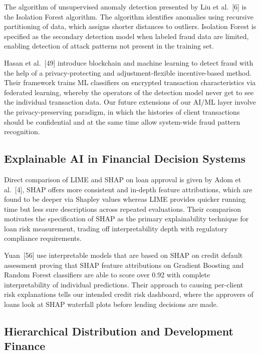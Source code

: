 \documentclass[12pt,a4paper]{report}
\begin{document}
The algorithm of unsupervised anomaly detection presented by Liu et al.~[6] is the Isolation Forest algorithm. The algorithm identifies anomalies using recursive partitioning of data, which assigns shorter distances to outliers. Isolation Forest is specified as the secondary detection model when labeled fraud data are limited, enabling detection of attack patterns not present in the training set.

Hasan et al.~[49] introduce blockchain and machine learning to detect fraud with the help of a privacy-protecting and adjustment-flexible incentive-based method. Their framework trains ML classifiers on encrypted transaction characteristics via federated learning, whereby the operators of the detection model never get to see the individual transaction data. Our future extensions of our AI/ML layer involve the privacy-preserving paradigm, in which the histories of client transactions should be confidential and at the same time allow system-wide fraud pattern recognition.

\subsection{Explainable AI in Financial Decision Systems}

Direct comparison of LIME and SHAP on loan approval is given by Adom et al.~[4], SHAP offers more consistent and in-depth feature attributions, which are found to be deeper via Shapley values whereas LIME provides quicker running time but less sure descriptions across repeated evaluations. Their comparison motivates the specification of SHAP as the primary explainability technique for loan risk measurement, trading off interpretability depth with regulatory compliance requirements.

Yuan~[56] use interpretable models that are based on SHAP on credit default assessment proving that SHAP feature attributions on Gradient Boosting and Random Forest classifiers are able to score over 0.92 with complete interpretability of individual predictions. Their approach to causing per-client risk explanations tells our intended credit risk dashboard, where the approvers of loans look at SHAP waterfall plots before lending decisions are made.

\subsection{Hierarchical Distribution and Development Finance}
\end{document}
